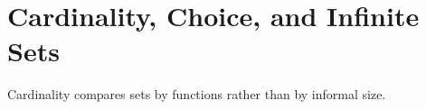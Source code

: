 \section{Cardinality, Choice, and Infinite Sets}

Cardinality compares sets by functions rather than by informal size.











